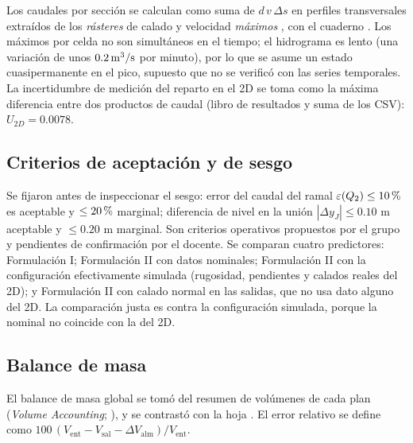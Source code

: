 Los caudales por sección se calculan como suma de $d\,v\,\Delta s$ en perfiles transversales extraídos de los \emph{rásteres} de calado y velocidad \emph{máximos} \citep{hecmanual}, con el cuaderno . Los máximos por celda no son simultáneos en el tiempo; el hidrograma es lento (una variación de unos $0.2\,\mathrm{m^3/s}$ por minuto), por lo que se asume un estado cuasipermanente en el pico, supuesto que no se verificó con las series temporales. La incertidumbre de medición del reparto en el 2D se toma como la máxima diferencia entre dos productos de caudal (libro de resultados y suma de los CSV): $U_{2D}=0.0078$.

\subsection{Criterios de aceptación y de sesgo}\label{sec:criterios}
Se fijaron antes de inspeccionar el sesgo: error del caudal del ramal $\varepsilon(Q_2)\leq10\text{\thinspace\%}$ es aceptable y $\leq20\text{\thinspace\%}$ marginal; diferencia de nivel en la unión $|\Delta y_J|\leq0.10$ m aceptable y $\leq0.20$ m marginal. Son criterios operativos propuestos por el grupo y pendientes de confirmación por el docente. Se comparan cuatro predictores: Formulación I; Formulación II con datos nominales; Formulación II con la configuración efectivamente simulada (rugosidad, pendientes y calados reales del 2D); y Formulación II con calado normal en las salidas, que no usa dato alguno del 2D. La comparación justa es contra la configuración simulada, porque la nominal no coincide con la del 2D.

\subsection{Balance de masa}
El balance de masa global se tomó del resumen de volúmenes de cada plan (\textit{Volume Accounting}; \citealt{hecmass}), y se contrastó con la hoja . El error relativo se define como $100\,(V_\mathrm{ent}-V_\mathrm{sal}-\Delta V_\mathrm{alm})/V_\mathrm{ent}$.
